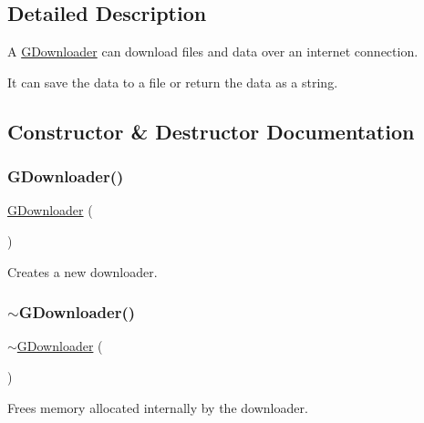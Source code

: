 \subsection{Detailed Description}
A \mbox{\hyperlink{classsgl_1_1GDownloader}{G\+Downloader}} can download files and data over an internet connection. 

It can save the data to a file or return the data as a string. 

\subsection{Constructor \& Destructor Documentation}
\mbox{\label{classsgl_1_1GDownloader_a03a6336ad3aebf9d5904c50ce0cdc1dc}} 
\subsubsection{\texorpdfstring{G\+Downloader()}{GDownloader()}}
{\footnotesize\ttfamily \mbox{\hyperlink{classsgl_1_1GDownloader}{G\+Downloader}} (\begin{DoxyParamCaption}{ }\end{DoxyParamCaption})}



Creates a new downloader. 

\mbox{\label{classsgl_1_1GDownloader_a6a9f476cb937e98d417d8ab43b8cd8d5}} 
\subsubsection{\texorpdfstring{$\sim$\+G\+Downloader()}{~GDownloader()}}
{\footnotesize\ttfamily $\sim$\mbox{\hyperlink{classsgl_1_1GDownloader}{G\+Downloader}} (\begin{DoxyParamCaption}{ }\end{DoxyParamCaption})\hspace{0.3cm}{\ttfamily [virtual]}}



Frees memory allocated internally by the downloader. 



